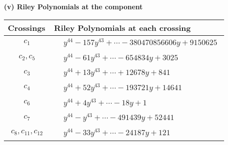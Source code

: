 \documentclass[1p]{elsarticle_modified}
\theoremstyle{definition}
\begin{document}
\newpage\renewcommand{\arraystretch}{1}
\flushleft \textbf{(v) Riley Polynomials at the component}\newline \\
\begin{tabular}{m{50pt}|m{274pt}}
Crossings & \hspace{64pt}Riley Polynomials at each crossing \\
\hline $$\begin{aligned}c_{1}\end{aligned}$$&$\begin{aligned}
&y^{44}-157 y^{43}+\cdots-380470856606 y+9150625
\end{aligned}$\\
\hline $$\begin{aligned}c_{2},c_{5}\end{aligned}$$&$\begin{aligned}
&y^{44}-61 y^{43}+\cdots-654834 y+3025
\end{aligned}$\\
\hline $$\begin{aligned}c_{3}\end{aligned}$$&$\begin{aligned}
&y^{44}+13 y^{43}+\cdots+12678 y+841
\end{aligned}$\\
\hline $$\begin{aligned}c_{4}\end{aligned}$$&$\begin{aligned}
&y^{44}+52 y^{43}+\cdots-193721 y+14641
\end{aligned}$\\
\hline $$\begin{aligned}c_{6}\end{aligned}$$&$\begin{aligned}
&y^{44}+4 y^{43}+\cdots-18 y+1
\end{aligned}$\\
\hline $$\begin{aligned}c_{7}\end{aligned}$$&$\begin{aligned}
&y^{44}- y^{43}+\cdots-491439 y+52441
\end{aligned}$\\
\hline $$\begin{aligned}c_{8},c_{11},c_{12}\end{aligned}$$&$\begin{aligned}
&y^{44}-33 y^{43}+\cdots-24187 y+121
\end{aligned}$\\

\end{tabular}
\end{document}
